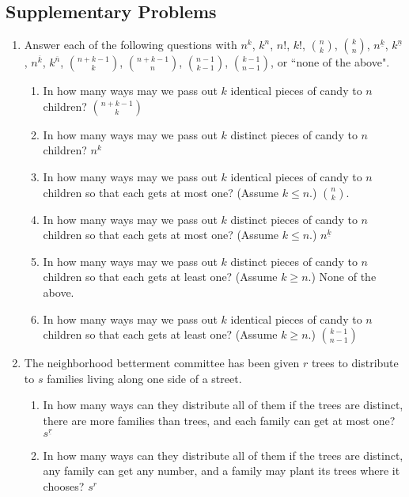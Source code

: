 \documentclass[10pt,]{book}
\theoremstyle{plain}
\theoremstyle{definition}
\numberwithin{equation}{chapter}
\begin{document}
\subsection[{Supplementary Problems}]{Supplementary Problems}\label{subsection-17}
\leavevmode%
\begin{enumerate}
\item\hypertarget{li-13}{}Answer each of the following questions with \(n^k\), \(k^n\), \(n!\), \(k!\), \(n \choose k\), \(k \choose n\), \(n^{\underline{k}}\), \(k^{\underline{n}}\), \(n^{\overline{k}}\), \(k^{\overline{n}}\), \(n+k-1\choose k\), \(n+k-1\choose n\), \(n-1\choose k-1\), \(k-1\choose n-1\), or ``none of the above". %
\begin{enumerate}
\item\hypertarget{li-14}{}In how many ways may we pass out \(k\) identical pieces of candy to \(n\) children? \(n+k-1\choose k\)%
%
\item\hypertarget{li-15}{}In how many ways may we pass out \(k\) distinct pieces of candy to \(n\) children? \(n^k\)%
%
\item\hypertarget{li-16}{}In how many ways may we pass out \(k\) identical pieces of candy to \(n\) children so that each gets at most one?  (Assume \(k\le n\).) \(n\choose k\).%
%
\item\hypertarget{li-17}{}In how many ways may we pass out \(k\) distinct pieces of candy to \(n\) children so that each gets at most one?  (Assume \(k\le n\).) \(n^{\underline{k}}\)%
%
\item\hypertarget{li-18}{}In how many ways may we pass out \(k\) distinct pieces of candy to \(n\) children so that each gets at least one?  (Assume \(k\ge n\).) None of the above.%
%
\item\hypertarget{li-19}{}In how many ways may we pass out \(k\) identical pieces of candy to \(n\) children so that each gets at least one?  (Assume \(k\ge n\).) \(k-1\choose n-1\)%
%
\end{enumerate}
%
\item\hypertarget{li-20}{}The neighborhood betterment committee has been given \(r\) trees to distribute to \(s\) families living along one side of a street. %
\begin{enumerate}
\item\hypertarget{li-21}{}In how many ways can they distribute all of them if the trees are distinct, there are more families than trees, and each family can get at most one? \(s^{\underline{r}}\)%
%
\item\hypertarget{li-22}{}In how many ways can they distribute all of them if the trees are distinct, any family can get any number, and a family may plant its trees where it chooses? \(s^r\)%

\end{enumerate}
\end{enumerate}
\end{document}
